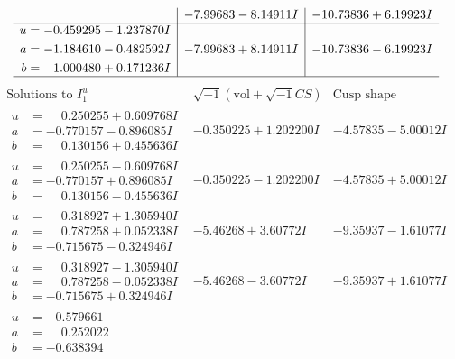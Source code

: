 \documentclass[1p]{elsarticle_modified}
\theoremstyle{definition}
\newcommand{\I}{\sqrt{-1}}
\begin{document}
$$\begin{array}{c|c|c}
 & -7.99683 - 8.14911 I & -10.73836 + 6.19923 I \\ \hline\begin{aligned}
u &= -0.459295 - 1.237870 I \\
a &= -1.184610 - 0.482592 I \\
b &= \phantom{-}1.000480 + 0.171236 I\end{aligned}
 & -7.99683 + 8.14911 I & -10.73836 - 6.19923 I\\
 \hline 
 \end{array}$$\newpage$$\begin{array}{c|c|c}  
\text{Solutions to }I^u_{1}& \I (\text{vol} + \sqrt{-1}CS) & \text{Cusp shape}\\
 \hline 
\begin{aligned}
u &= \phantom{-}0.250255 + 0.609768 I \\
a &= -0.770157 - 0.896085 I \\
b &= \phantom{-}0.130156 + 0.455636 I\end{aligned}
 & -0.350225 + 1.202200 I & -4.57835 - 5.00012 I \\ \hline\begin{aligned}
u &= \phantom{-}0.250255 - 0.609768 I \\
a &= -0.770157 + 0.896085 I \\
b &= \phantom{-}0.130156 - 0.455636 I\end{aligned}
 & -0.350225 - 1.202200 I & -4.57835 + 5.00012 I \\ \hline\begin{aligned}
u &= \phantom{-}0.318927 + 1.305940 I \\
a &= \phantom{-}0.787258 + 0.052338 I \\
b &= -0.715675 - 0.324946 I\end{aligned}
 & -5.46268 + 3.60772 I & -9.35937 - 1.61077 I \\ \hline\begin{aligned}
u &= \phantom{-}0.318927 - 1.305940 I \\
a &= \phantom{-}0.787258 - 0.052338 I \\
b &= -0.715675 + 0.324946 I\end{aligned}
 & -5.46268 - 3.60772 I & -9.35937 + 1.61077 I \\ \hline\begin{aligned}
u &= -0.579661\phantom{ +0.000000I} \\
a &= \phantom{-}0.252022\phantom{ +0.000000I} \\
b &= -0.638394\phantom{ +0.000000I}\end{aligned}

\end{array}$$
\end{document}
